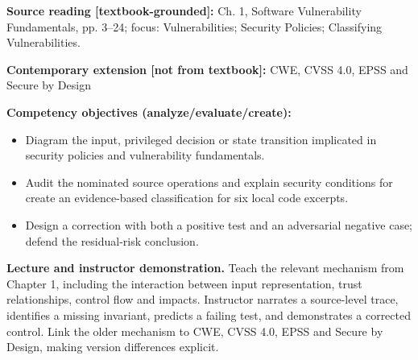 \documentclass[10pt,letterpaper]{article}
\begin{document}
\textbf{Source reading [textbook-grounded]:} Ch. 1, Software Vulnerability Fundamentals, pp. 3--24; focus: Vulnerabilities; Security Policies; Classifying Vulnerabilities.

\textbf{Contemporary extension [not from textbook]:} CWE, CVSS 4.0, EPSS and Secure by Design

\textbf{Competency objectives (analyze/evaluate/create):}
\begin{itemize}[leftmargin=*,itemsep=2pt]
\item Diagram the input, privileged decision or state transition implicated in security policies and vulnerability fundamentals.
\item Audit the nominated source operations and explain security conditions for create an evidence-based classification for six local code excerpts.
\item Design a correction with both a positive test and an adversarial negative case; defend the residual-risk conclusion.
\end{itemize}
\textbf{Lecture and instructor demonstration.} Teach the relevant mechanism from Chapter 1, including the interaction between input representation, trust relationships, control flow and impacts. Instructor narrates a source-level trace, identifies a missing invariant, predicts a failing test, and demonstrates a corrected control. Link the older mechanism to CWE, CVSS 4.0, EPSS and Secure by Design, making version differences explicit.
\end{document}
